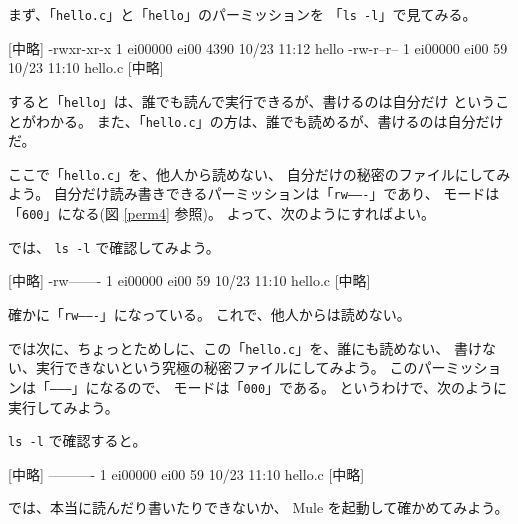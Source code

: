 \bigskip

まず、「\texttt{hello.c}」と「\texttt{hello}」のパーミッションを
「\texttt{ls -l}」で見てみる。

\begin{progls}
 [中略]
-rwxr-xr-x  1 ei00000  ei00  4390  10/23 11:12  hello
-rw-r--r--  1 ei00000  ei00    59  10/23 11:10  hello.c
 [中略]
%
\end{progls}

すると「\texttt{hello}」は、誰でも読んで実行できるが、書けるのは自分だけ
ということがわかる。
また、「\texttt{hello.c}」の方は、誰でも読めるが、書けるのは自分だけだ。

\bigskip

ここで「\texttt{hello.c}」を、他人から読めない、
自分だけの秘密のファイルにしてみよう。
自分だけ読み書きできるパーミッションは「\texttt{rw-------}」であり、
モードは「\texttt{600}」になる(図 \ref{perm4} 参照)。
よって、次のようにすればよい。

\begin{progls}
%
\end{progls}

では、 \texttt{ls -l} で確認してみよう。

\begin{progls}
 [中略]
-rw-------  1 ei00000  ei00    59  10/23 11:10  hello.c
 [中略]
%
\end{progls}

確かに「\texttt{rw-------}」になっている。
これで、他人からは読めない。

\bigskip

では次に、ちょっとためしに、この「\texttt{hello.c}」を、誰にも読めない、
書けない、実行できないという究極の秘密ファイルにしてみよう。
このパーミッションは「\texttt{---------}」になるので、
モードは「\texttt{000}」である。
というわけで、次のように実行してみよう。

\begin{progls}
%
\end{progls}

 \texttt{ls -l} で確認すると。

\begin{progls}
 [中略]
----------  1 ei00000  ei00    59  10/23 11:10  hello.c
 [中略]
%
\end{progls}

では、本当に読んだり書いたりできないか、 Mule を起動して確かめてみよう。

\begin{progls}
%
\end{progls}


